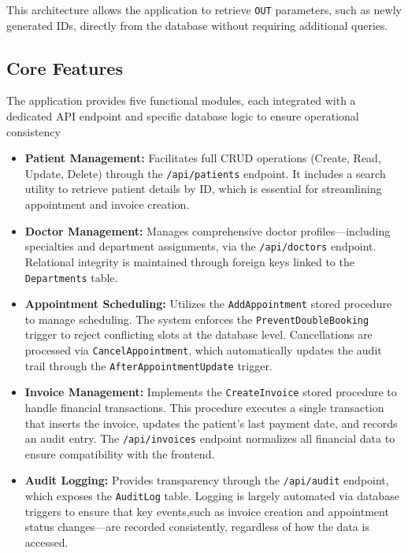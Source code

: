 This architecture allows the application to retrieve \texttt{OUT} parameters, such as newly generated IDs, directly from the database without requiring additional queries.

\subsection{Core Features}

The application provides five functional modules, each integrated with a dedicated API endpoint and specific database logic to ensure operational consistency

\begin{itemize}
    \item \textbf{Patient Management:} Facilitates full CRUD operations (Create, Read, Update, Delete) through the \texttt{/api/patients} endpoint. It includes a search utility to retrieve patient details by ID, which is essential for streamlining appointment and invoice creation.
    \item \textbf{Doctor Management:} Manages comprehensive doctor profiles—including specialties and department assignments, via the \texttt{/api/doctors} endpoint. Relational integrity is maintained through foreign keys linked to the \texttt{Departments} table.
    \item \textbf{Appointment Scheduling:} Utilizes the \texttt{AddAppointment} stored procedure to manage scheduling. The system enforces the \texttt{PreventDoubleBooking} trigger to reject conflicting slots at the database level. Cancellations are processed via \texttt{CancelAppointment}, which automatically updates the audit trail through the \texttt{AfterAppointmentUpdate} trigger.
    \item \textbf{Invoice Management:} Implements the \texttt{CreateInvoice} stored procedure to handle financial transactions. This procedure executes a single transaction that inserts the invoice, updates the patient's last payment date, and records an audit entry. The \texttt{/api/invoices} endpoint normalizes all financial data to ensure compatibility with the frontend.
    \item \textbf{Audit Logging:} Provides transparency through the \texttt{/api/audit} endpoint, which exposes the \texttt{AuditLog} table. Logging is largely automated via database triggers to ensure that key events,such as invoice creation and appointment status changes—are recorded consistently, regardless of how the data is accessed.
\end{itemize}

